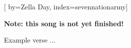 
[%
    by={Zella Day},
    index={sevennationarmy}]


    \label{sevennationarmy}

    \textbf{Note: this song is not yet finished!}

    \beginverse
        Example verse ...
    \endverse
\endsong
